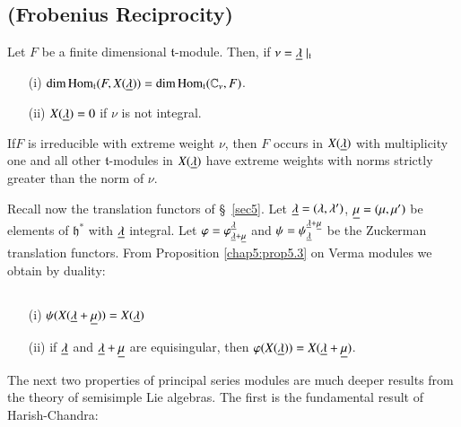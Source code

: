 \setcounter{section}{8}
\setcounter{subsection}{2}
\subsection{(Frobenius Reciprocity)}\label{chap8:subsec8.3}
 Let $F$ be a finite dimensional
$\mathfrak{t}$-module. Then, if $\nu = \underline{\lambda}\mid_{\mathfrak{t}}$
\begin{itemize}
\item[{\rm(i)}] $\dim \operatorname{Hom}_\mathfrak{t} (F,X(\underline{\lambda})) = \dim
  \operatorname{Hom}_\mathfrak{t} (\mathbb{C}_\nu, F)$. 

\item[{\rm (ii)}] $X(\underline{\lambda}) = 0$ if $\nu$ is not integral. 
\end{itemize}

\setcounter{prop}{3}
\begin{coro}\label{chap8:coro8.4}
If\pageoriginale $F$ is irreducible with extreme weight $\nu$, then
$F$ occurs in $X(\underline{\lambda})$ with multiplicity one and all other
$\mathfrak{t}$-modules in $X(\underline{\lambda})$ have extreme weights with
norms strictly greater than the norm of $\nu$.
\end{coro}



Recall now the translation functors of \S\ \ref{sec5}. Let $\underline{\lambda} =
(\lambda, \lambda')$, $\underline{\mu} = (\mu, \mu')$ be elements of
$\mathfrak{h}^*$ with $\underline{\lambda}$ integral. Let $\varphi =
\varphi^{\underline{\lambda}}_{\underline{\lambda} + \underline{\mu}}$ and $\psi =
\psi^{\underline{\lambda} + \underline{\mu}}_{\underline{\lambda}}$ be the Zuckerman
translation functors. From Proposition \ref{chap5:prop5.3} on Verma
modules we obtain by duality:

\setcounter{subsection}{4}
\subsection{}\label{chap8:subsec8.5}
\begin{itemize}
\item[{\rm (i)}] $\psi(X(\underline{\lambda} + \underline{\mu})) = X(\underline{\lambda})$

\item[{\rm (ii)}] if $\underline{\lambda}$ and $\underline{\lambda} + \underline{\mu}$ are
  equisingular, then $\varphi (X(\underline{\lambda})) = X(\underline{\lambda} +
  \underline{\mu})$. 
\end{itemize}

The next two properties of principal series modules are much deeper
results from the theory of semisimple Lie algebras. The first is the
fundamental result of Harish-Chandra:

